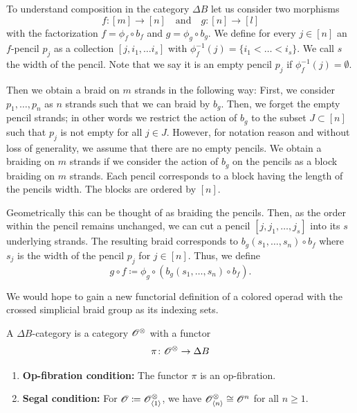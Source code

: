 \begin{rem}
    To understand composition in the category $\Delta B$ let us consider two morphisms
    \[
    f \colon [m] \to [n] \quad \text{and} \quad g \colon [n] \to [l]
    \]
    with the factorization $f = \phi_f \circ b_f$ and $g = \phi_g \circ b_g$. 
    We define for every $j \in [n]$ an $f$-pencil $p_j$ as a collection $[j, i_1, \dots i_s]$ 
    with $\phi_f^{-1}(j) = \{i_1 < \dots < i_s\}$. We call $s$ the width of the pencil. Note 
    that we say it is an empty pencil $p_j$ if $\phi_f^{-1}(j) = \emptyset$.
    
    Then we obtain a braid on $m$ strands in the following way:
    First, we consider $p_1, \dots, p_n$ as $n$ strands such that we can braid by $b_g$. Then, 
    we forget the empty pencil strands; in other words we restrict the action of $b_g$ to the 
    subset $J \subset [n]$ such that $p_j$ is not empty for all $j \in J$. However, for notation reason and without loss of generality, we assume that there are no empty pencils.    
    We obtain a braiding on $m$ strands if we consider the action of $b_g$ on the pencils as a 
    block braiding on $m$ strands. Each pencil corresponds to a block having the length of the 
    pencils width. The blocks are ordered by $[n]$.

    Geometrically this can be thought of as braiding the pencils. Then, as the order within the pencil remains unchanged, we can cut a pencil $[j, j_1, \dots, j_s]$ into its $s$ underlying strands. The resulting braid corresponds to $b_g(s_1, \dots, s_n) \circ b_f$ where $s_j$ is the width of the pencil $p_j$ for $j \in [n]$.
    Thus, we define
    \[
        g \circ f \coloneqq \phi_g \circ (b_g(s_1, \dots, s_n) \circ b_f).
    \]
\end{rem}

We would hope to gain a new functorial definition of a colored operad with the crossed simplicial braid group as its indexing sets. 
\begin{defin}
    A $\Delta B$-category is a category $\mathscr{O}^{\otimes}$ with a functor
    $$\pi \colon \mathscr{O}^{\otimes} \to \Delta B$$
    \begin{enumerate}
        \item \textbf{Op-fibration condition:} The functor $\pi$ is an op-fibration.
        \item \textbf{Segal condition:} For $\mathscr{O} \coloneqq \mathscr{O}^{\otimes}_{\langle 1 \rangle}$, 
        we have $\mathscr{O}^{\otimes}_{\langle n \rangle} \cong \mathscr{O}^n$ for all $n \geq 1$. 
    \end{enumerate}
\end{defin}


